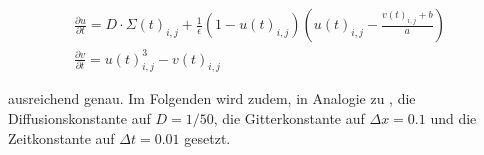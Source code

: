 \begin{equation}
\begin{gathered}
\frac{\partial u}{\partial t} =  D\cdot \Sigma(t)_{i,j} + \frac{1}{\epsilon} (1-u(t)_{i,j}) \left(u(t)_{i,j}-\frac{v(t)_{i,j}+b}{a}\right)\\
\frac{\partial v}{\partial t} = u(t)_{i,j}^3-v(t)_{i,j}
\end{gathered}
\end{equation}

ausreichend genau. Im Folgenden wird zudem, in Analogie zu \citep{berg2011synchronization}, die Diffusionskonstante auf $D = 1/50$, die Gitterkonstante auf $\Delta x = 0.1$ und die Zeitkonstante auf $\Delta t = 0.01$ gesetzt. 